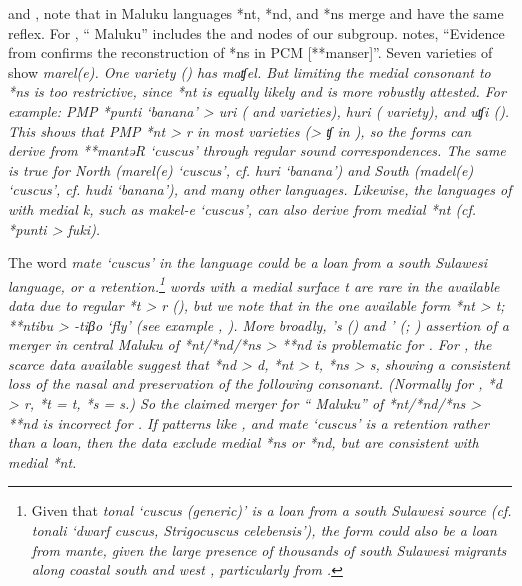 \citet[41]{Stresemann1927} and \citet[36]{Collins1981}, \citeyear[55]{Collins1983} note
that in  Maluku languages *nt,
*nd, and *ns merge
and have the same reflex.
For \citet{Collins1986}, “ Maluku” includes the  and  nodes of our  subgroup.
\citet[43, endnote 29]{Collins1981} notes, “Evidence from  confirms
the reconstruction of *ns in PCM [**manser]”.
Seven varieties of  show \it{marel(e)}.
One variety () has \it{maʧel}.
But limiting the medial consonant to *ns is too restrictive,
since *nt is equally likely
and is more robustly attested.
For example: PMP *punti ‘banana’ >  \it{uri} (
and  varieties), \it{huri} ( variety), and \it{uʧi} ().
This shows that PMP *nt > \it{r} in most  varieties (> \it{ʧ}
in ), so the  forms can derive from **mantəR ‘cuscus’ through regular sound correspondences.
The same is true for North  (\it{marel(e)} ‘cuscus’, cf.
\it{huri} ‘banana’) and South  (\it{madel(e)} ‘cuscus’, cf.
\it{hudi} ‘banana’), and many other languages.
Likewise, the  languages of  with
medial \it{k}, such as  \it{makel-e} ‘cuscus’,
can also derive from medial *nt (cf.
*punti >  \it{fuki}).

The word \it{mate} ‘cuscus’ in the  language 
could be a loan from a south Sulawesi language,
or a retention.\footnote{
Given that  \it{tonal} ‘cuscus (generic)’
is a loan from a south Sulawesi source (cf.
 \it{tonali} ‘dwarf cuscus,
\it{Strigocuscus celebensis}’), the  form could also be
a loan from \it{mante},
given the large presence of thousands of south Sulawesi migrants
along coastal south and west , particularly from .}
 words with
a medial surface \it{t} are rare in the available data due to
regular *t > \it{r} (),
but we note that in the one available form *nt > \it{t}; **ntibu
> \it{-tiβo} ‘fly’ (see example , ).
More broadly, \citeauthor{Stresemann1927}’s (\citeyear[41]{Stresemann1927})
and \citeauthor{Collins1981}’ (\citeyear[36]{Collins1981}; \citeyear[55]{Collins1983}) assertion of a merger in central
Maluku of *nt/*nd/*ns > **nd is problematic for .
For , the scarce data available suggest that *nd > \it{d},
*nt > \it{t}, *ns > \it{s},
showing a consistent loss of the nasal
and preservation of the following consonant.
(Normally for , *d > \it{r},
*t = \it{t}, *s = \it{s}.) So the claimed merger for “
Maluku” of *nt/*nd/*ns > **nd is incorrect for .
If  patterns like ,
and \it{mate} ‘cuscus’ is a retention rather than a loan,
then the  data exclude medial *ns or *nd,
but are consistent with medial *nt.

